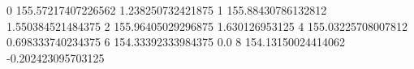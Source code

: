 0 155.57217407226562 1.238250732421875
1 155.88430786132812 1.550384521484375
2 155.96405029296875 1.630126953125
4 155.03225708007812 0.698333740234375
6 154.33392333984375 0.0
8 154.13150024414062 -0.202423095703125

